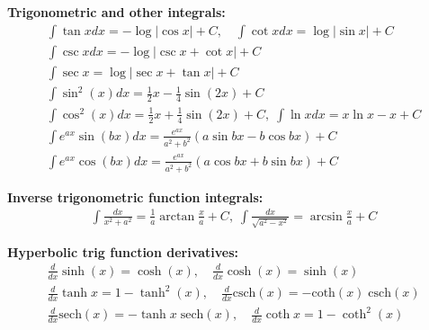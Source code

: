 \documentclass[10pt,landscape]{article}
\makeatletter
\renewcommand{\section}{\@startsection{section}{1}{0mm}%
                                {-1ex}%
                                {0.5ex}%
                                {\normalfont\large\bfseries}}
\makeatother
\begin{document}
\begin{multicols}{3}
\par \textbf{Trigonometric and other integrals:}
\begin{gather*}
\int \tan x dx = - \log|\cos x| + C, \quad \int \cot x dx = \log | \sin x | + C \\
\int \csc x dx = - \log |\csc x + \cot x| + C \\
\int \sec x = \log |\sec x + \tan x| + C\\
\int \sin^2(x) dx = \frac{1}{2}x - \frac{1}{4} \sin(2x) + C \\
\int \cos^2(x)dx = \frac{1}{2} x + \frac{1}{4} \sin(2x) + C, \; \int \ln x dx = x \ln x - x + C \\
\int e^{ax} \sin (bx)dx = \frac{e^{ax}}{a^2 + b^2}(a \sin bx - b \cos bx) + C \\
\int e^{ax} \cos (bx)dx = \frac{e^{ax}}{a^2 + b^2}(a \cos bx + b \sin bx) + C 
\end{gather*}

\par \textbf{Inverse trigonometric function integrals:}
\begin{gather*}
\int \frac{dx}{x^2 + a^2} = \frac{1}{a} \arctan \frac{x}{a} + C, \; \int \frac{dx}{\sqrt{a^2 - x^2}} = \arcsin \frac{x}{a} + C 
\end{gather*}

\par \textbf{Hyperbolic trig function derivatives:}
\begin{gather*}
\frac{d}{dx} \sinh (x) = \cosh (x), \quad \frac{d}{dx}\cosh (x) = \sinh (x)\\
\frac{d}{dx}\tanh x = 1 - \tanh^2 (x), \quad \frac{d}{dx}\text{csch} (x) = - \text{coth}(x) \; \text{csch}(x) \\
\frac{d}{dx}\text{sech} (x) = - \tanh x \; \text{sech} (x), \quad
\frac{d}{dx}\coth x = 1 - \coth^2 (x)
\end{gather*}









\end{multicols}
\end{document}
